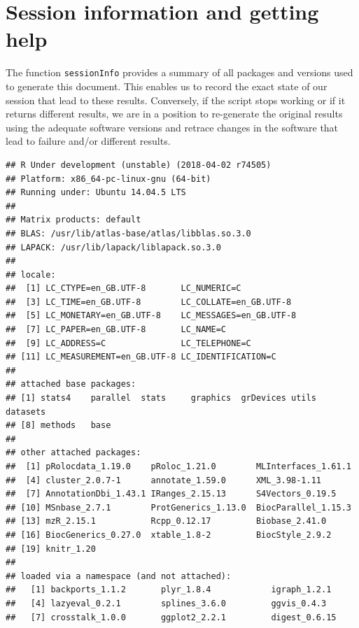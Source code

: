 \section*{Session information and getting help}

The function \texttt{sessionInfo} provides a summary of all packages
and versions used to generate this document. This enables us to record
the exact state of our session that lead to these results. Conversely,
if the script stops working or if it returns different results, we are
in a position to re-generate the original results using the adequate
software versions and retrace changes in the software that lead to
failure and/or different results.

\begin{knitrout}
\color{fgcolor}\begin{kframe}
\begin{alltt}
\hlstd{()}
\end{alltt}
\begin{verbatim}
## R Under development (unstable) (2018-04-02 r74505)
## Platform: x86_64-pc-linux-gnu (64-bit)
## Running under: Ubuntu 14.04.5 LTS
## 
## Matrix products: default
## BLAS: /usr/lib/atlas-base/atlas/libblas.so.3.0
## LAPACK: /usr/lib/lapack/liblapack.so.3.0
## 
## locale:
##  [1] LC_CTYPE=en_GB.UTF-8       LC_NUMERIC=C              
##  [3] LC_TIME=en_GB.UTF-8        LC_COLLATE=en_GB.UTF-8    
##  [5] LC_MONETARY=en_GB.UTF-8    LC_MESSAGES=en_GB.UTF-8   
##  [7] LC_PAPER=en_GB.UTF-8       LC_NAME=C                 
##  [9] LC_ADDRESS=C               LC_TELEPHONE=C            
## [11] LC_MEASUREMENT=en_GB.UTF-8 LC_IDENTIFICATION=C       
## 
## attached base packages:
## [1] stats4    parallel  stats     graphics  grDevices utils     datasets 
## [8] methods   base     
## 
## other attached packages:
##  [1] pRolocdata_1.19.0    pRoloc_1.21.0        MLInterfaces_1.61.1 
##  [4] cluster_2.0.7-1      annotate_1.59.0      XML_3.98-1.11       
##  [7] AnnotationDbi_1.43.1 IRanges_2.15.13      S4Vectors_0.19.5    
## [10] MSnbase_2.7.1        ProtGenerics_1.13.0  BiocParallel_1.15.3 
## [13] mzR_2.15.1           Rcpp_0.12.17         Biobase_2.41.0      
## [16] BiocGenerics_0.27.0  xtable_1.8-2         BiocStyle_2.9.2     
## [19] knitr_1.20          
## 
## loaded via a namespace (and not attached):
##   [1] backports_1.1.2       plyr_1.8.4            igraph_1.2.1         
##   [4] lazyeval_0.2.1        splines_3.6.0         ggvis_0.4.3          
##   [7] crosstalk_1.0.0       ggplot2_2.2.1         digest_0.6.15        

\end{verbatim}
\end{kframe}
\end{knitrout}
